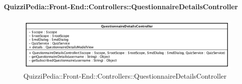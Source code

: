\paragraph[QuizziPedia::Front-End::Controllers\\::QuestionnaireDetailsController]{QuizziPedia::Front-End::Controllers::QuestionnaireDetailsController}
\begin{figure} [ht]
	\centering
	\includegraphics[scale=0.6]{UML/Classi/Front-End/QuizziPedia_Front-end_Controller_QuestionnaireDetailsController.png}
	\caption{QuizziPedia::Front-End::Controllers::QuestionnaireDetailsController}
\end{figure} \FloatBarrier
